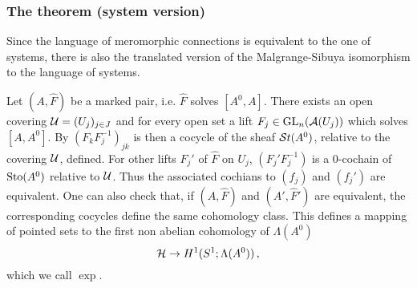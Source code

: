 \subsubsection{The theorem (system version)}
Since the language of meromorphic connections is equivalent to the one of
systems, there is also the translated version of the Malgrange-Sibuya
isomorphism to the language of systems.
\begin{comment}
  \begin{itemize}
    \item \TODO[See \cite{thboalch} for sheaf-less definition]
  \end{itemize}
\end{comment}
Let $(A,\hat F)$ be a marked pair, i.e. $\hat F$ solves $[A^0,A]$.
There exists an open covering $\mathcal{U}=(U_j)_{j\in J}$ and for every open set
a lift $F_j\in\operatorname{GL}_n(\mathcal{A}(U_j))$ which solves $[A,A^0]$.
By $(F_kF_j^{-1})_{jk}$ is then a cocycle of the sheaf $\mathcal{S}{}t(A^0)$, relative to
the covering $\mathcal{U}$, defined.
For other lifts $F_j'$ of $\hat F$ on $U_j$, $(F_j'F_j^{-1})$ is a $0$-cochain
of $\operatorname{Sto}(A^0)$ relative to $\mathcal{U}$.
Thus the associated cochians to $(f_j)$ and $(f_j')$ are equivalent.
One can also check that, if $(A,\hat F)$ and $(A',\hat F')$ are equivalent, the
corresponding cocycles define the same cohomology class.
This defines a mapping of pointed sets to the first non abelian cohomology of
$\Lambda(A^0)$
\[
  \mathcal{H}\to H^1(S^1;\Lambda(A^0)) \,,
\]
which we call $\exp$.

